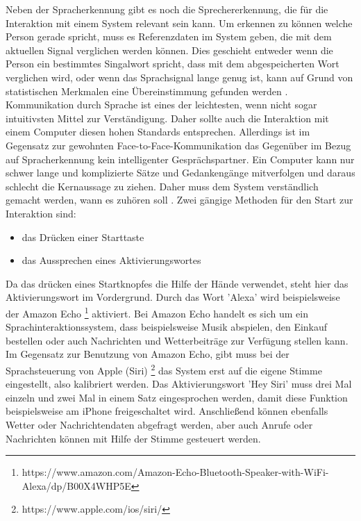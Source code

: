\newline \newline
Neben der Spracherkennung gibt es noch die Sprechererkennung, die für die Interaktion mit einem System relevant sein kann. Um erkennen zu können welche Person gerade spricht, muss es Referenzdaten im System geben, die mit dem aktuellen Signal verglichen werden können. Dies geschieht entweder wenn die Person ein bestimmtes Singalwort spricht, dass mit dem abgespeicherten Wort verglichen wird, oder wenn das Sprachsignal lange genug ist, kann auf Grund von statistischen Merkmalen eine Übereinstimmung gefunden werden \cite{KaufmannPfisterSprache}. 
\newline \newline
Kommunikation durch Sprache ist eines der leichtesten, wenn nicht sogar intuitivsten Mittel zur Verständigung. Daher sollte auch die Interaktion mit einem Computer diesen hohen Standards entsprechen. Allerdings ist im Gegensatz zur gewohnten Face-to-Face-Kommunikation das Gegenüber im Bezug auf Spracherkennung kein intelligenter Gesprächspartner. Ein Computer kann nur schwer lange und komplizierte Sätze und Gedankengänge mitverfolgen und daraus schlecht die Kernaussage zu ziehen. Daher muss dem System verständlich gemacht werden, wann es zuhören soll \cite{SpeechInteraction}.
Zwei gängige Methoden für den Start zur Interaktion sind:
\begin{itemize}
      \item das Drücken einer Starttaste
      \item das Aussprechen eines Aktivierungswortes
\end{itemize}
\vspace{\baselineskip}
Da das drücken eines Startknopfes die Hilfe der Hände verwendet, steht hier das Aktivierungswort im Vordergrund.
Durch das Wort 'Alexa' wird beispielsweise der Amazon Echo %
\footnote{https://www.amazon.com/Amazon-Echo-Bluetooth-Speaker-with-WiFi-Alexa/dp/B00X4WHP5E}
%
aktiviert. Bei Amazon Echo handelt es sich um
ein Sprachinteraktionssystem, dass beispielsweise Musik abspielen, den Einkauf bestellen oder auch Nachrichten und Wetterbeiträge zur Verfügung stellen kann.
Im Gegensatz zur Benutzung von Amazon Echo, gibt muss bei der Sprachsteuerung von Apple (Siri)%
\footnote{https://www.apple.com/ios/siri/}
%
 das System erst auf die eigene Stimme eingestellt, also kalibriert werden. Das Aktivierungswort 'Hey Siri' muss drei Mal einzeln und zwei Mal in einem Satz eingesprochen werden, damit diese Funktion beispielsweise am iPhone freigeschaltet wird. Anschließend können ebenfalls Wetter oder Nachrichtendaten abgefragt werden, aber auch Anrufe oder Nachrichten können mit Hilfe der Stimme gesteuert werden. 
